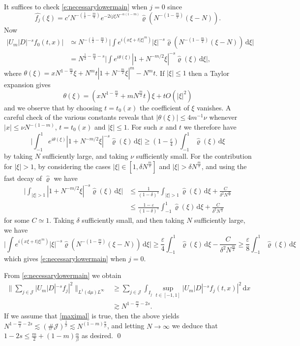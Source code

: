 \documentclass[a4paper]{amsart}
\numberwithin{equation}{section}%
\theoremstyle{plain}%
\theoremstyle{definition}
\theoremstyle{remark}%
\def\d{\mathrm{d}}
\newcommand{\J}{\mathcal{J}}
\begin{document}
It suffices to check \eqref{e:necessarylowermain} when $j = 0$ since
\[
    \widehat{f_j}(\xi)
    =
    c' 
    N^{-(\frac12-\frac m4)}e^{-2ij\xi N^{-\alpha(1-m)}}\widehat{\varrho}(N^{-(1-\frac m2)}(\xi-N)). 
\]
Now 
\begin{align*}
    |U_m | D|^{-s}f_0(t,x)|
    &\simeq
    N^{-(\frac12-\frac m4)}\bigg|\int e^{i(x\xi+t|\xi|^m)}|\xi|^{-s}\widehat{\varrho}(N^{-(1-\frac m2)}(\xi-N))\,\d\xi\bigg|\\
    &=
 N^{\frac{1}{2} - \frac{m}{4} - s} \bigg|\int e^{i\theta(\xi)}|1 + N^{-m/2}\xi|^{-s} \widehat{\varrho}(\xi)\,\d\xi\bigg|,
\end{align*}
where $\theta(\xi)=xN^{1-\frac m2}\xi+N^mt|1+N^{-\frac m2}\xi|^m - N^mt$. If $|\xi| \leq 1$ then a Taylor expansion gives
\[
\theta(\xi) = (xN^{1-\frac m2} + mN^\frac{m}{2}t)\xi+ tO(|\xi|^2)
\]
and we observe that by choosing $t = t_0(x)$ the coefficient of $\xi$ vanishes. A careful check of the various constants reveals that $|\theta(\xi)| \leq 4m^{-1}\nu$ whenever $|x|\leq \nu N^{-(1-m)}$, $t = t_0(x)$ and $|\xi| \leq 1$. For such $x$ and $t$ we therefore have
\[
\bigg|\int_{-1}^1 e^{i\theta(\xi)}|1 + N^{-m/2}\xi|^{-s}\widehat{\varrho}(\xi)\,\d\xi \bigg| \geq (1 - \tfrac{\varepsilon}{4}) \int_{-1}^1 \widehat{\varrho}(\xi) \, \mathrm{d}\xi
\]
by taking $N$ sufficiently large, and taking $\nu$ sufficiently small. For the contribution for $|\xi| > 1$, by considering the cases $|\xi| \in [1,\delta N^\frac{m}{2}]$ and $|\xi| > \delta N^\frac{m}{2}$, and using the fast decay of $\widehat{\varrho}$ we have
\begin{align*}
\bigg|\int_{|\xi| > 1} |1 + N^{-m/2}\xi|^{-s}\widehat{\varrho}(\xi)\,\d\xi \bigg| & \leq \frac{1}{(1-\delta)^s} \int_{|\xi| > 1} \widehat{\varrho}(\xi) \, \mathrm{d}\xi + \frac{C}{\delta^2 N^{\frac{m}{2}}} \\
& \leq \frac{1-\varepsilon}{(1-\delta)^s} \int_{-1}^1 \widehat{\varrho}(\xi) \, \mathrm{d}\xi + \frac{C}{\delta^2 N^{\frac{m}{2}}}
\end{align*}
for some $C \simeq 1$. Taking $\delta$ sufficiently small, and then taking $N$ sufficiently large, we have
\[
\bigg|\int e^{i(x\xi+t|\xi|^m)}|\xi|^{-s}\widehat{\varrho}(N^{-(1-\frac m2)}(\xi-N))\,\d\xi\bigg| \geq  \frac{\varepsilon}{4} \int_{-1}^1 \widehat{\varrho}(\xi) \, \mathrm{d}\xi - \frac{C}{\delta^2 N^{\frac{m}{2}}} \geq   \frac{\varepsilon}{8} \int_{-1}^1 \widehat{\varrho}(\xi) \, \mathrm{d}\xi 
\]
which gives \eqref{e:necessarylowermain} when $j = 0$.

From \eqref{e:necessarylowermain} we obtain
\begin{align*}
    \bigg\|\sum_{j\in \J} |U_m|D|^{-s}f_j|^2\bigg\|_{L^1(\d\mu)L^\infty}
    &\geq
    \sum_{j\in\J} \int_{I_j} \sup_{t\in[-1,1]}|U_m|D|^{-s}f_j(t,x)|^2\,\d x\\
    &\gtrsim
    N^{1-\frac m2-2s}.
\end{align*}
If we assume that \eqref{maximal} is true, then the above yields $N^{1-\frac m2-2s} \lesssim (\#\J)^\frac1\beta \lesssim N^{(1-m)\frac\alpha\beta}$, and letting $N \to \infty$ we deduce that $1-2s\leq\frac m2 +(1-m)\frac\alpha\beta$ as desired. \qed
\end{document}
